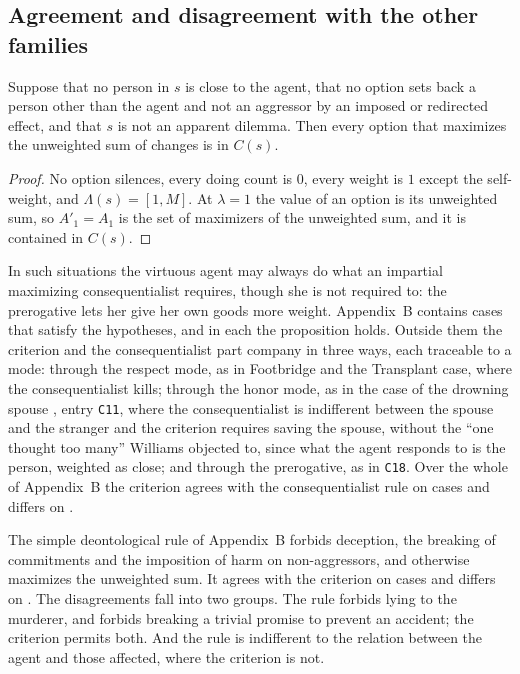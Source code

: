 \documentclass{situationist-preprint}
\newcommand{\Ch}{C}
\begin{document}
\subsection{Agreement and disagreement with the other families}

\begin{proposition}\label{p:impartial}
Suppose that no person in $s$ is close to the agent, that no option sets back a person other than the agent and not an aggressor by an imposed or redirected effect, and that $s$ is not an apparent dilemma. Then every option that maximizes the unweighted sum of changes is in $\Ch(s)$.
\end{proposition}

\begin{proof}
No option silences, every doing count is $0$, every weight is $1$ except the self-weight, and $\Lambda(s)=[1,M]$. At $\lambda=1$ the value of an option is its unweighted sum, so $A'_1=A_1$ is the set of maximizers of the unweighted sum, and it is contained in $\Ch(s)$.
\end{proof}

In such situations the virtuous agent may always do what an impartial maximizing consequentialist requires, though she is not required to: the prerogative lets her give her own goods more weight. Appendix~B contains \stnweak{} cases that satisfy the hypotheses, and in each the proposition holds. Outside them the criterion and the consequentialist part company in three ways, each traceable to a mode: through the respect mode, as in Footbridge and the Transplant case, where the consequentialist kills; through the honor mode, as in the case of the drowning spouse \citep{Williams1981}, entry \texttt{C11}, where the consequentialist is indifferent between the spouse and the stranger and the criterion requires saving the spouse, without the \enquote{one thought too many} Williams objected to, since what the agent responds to is the person, weighted as close; and through the prerogative, as in \texttt{C18}. Over the whole of Appendix~B the criterion agrees with the consequentialist rule on \stnconsagree{} cases and differs on \stnconsdis{}.

The simple deontological rule of Appendix~B forbids deception, the breaking of commitments and the imposition of harm on non-aggressors, and otherwise maximizes the unweighted sum. It agrees with the criterion on \stndeoagree{} cases and differs on \stndeodis{}. The disagreements fall into two groups. The rule forbids lying to the murderer, and forbids breaking a trivial promise to prevent an accident; the criterion permits both. And the rule is indifferent to the relation between the agent and those affected, where the criterion is not.
\end{document}
